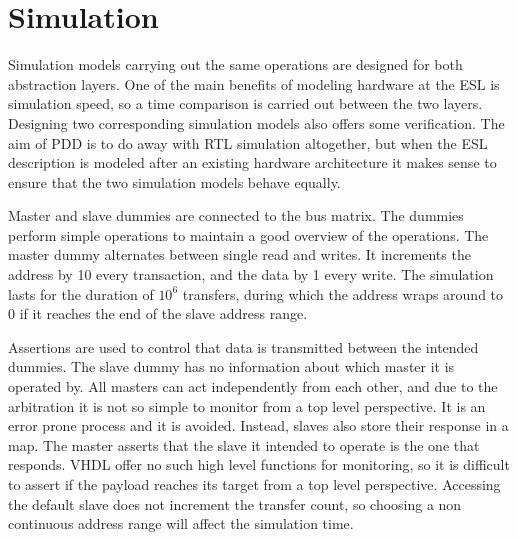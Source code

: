 \section{Simulation}
\label{sec:sim}
Simulation models carrying out the same operations are designed for both abstraction layers. One of the main benefits of modeling hardware at the ESL is simulation speed, so a time comparison is carried out between the two layers. Designing two corresponding simulation models also offers some verification. 
The aim of PDD is to do away with RTL simulation altogether, but when the ESL description is modeled after an existing hardware architecture it makes sense
to ensure that the two simulation models behave equally. \par
Master and slave dummies are connected to the bus matrix. The dummies perform simple operations to maintain a good overview of the operations. 
The master dummy alternates between single read and writes. It increments the address by 10 every transaction, and the data by 1 every write. 
The simulation lasts for the duration of $10^6$ transfers, during which the address wraps around to 0 if it reaches the end of the slave address range. \par
Assertions are used to control that data is transmitted between the intended dummies. The slave dummy has no information about which master it is operated by. 
All masters can act independently from each other, and due to the arbitration it is not so simple to monitor from a top level perspective. It is an error prone
process and it is avoided. Instead, slaves also store their response in a map. The master asserts that the slave it intended to operate is the one that responds. VHDL offer no such high level functions for monitoring, so it is difficult to assert if the payload reaches its target from a top level perspective.
Accessing the default slave does not increment the transfer count, so choosing a non continuous address range will affect the simulation time.  

